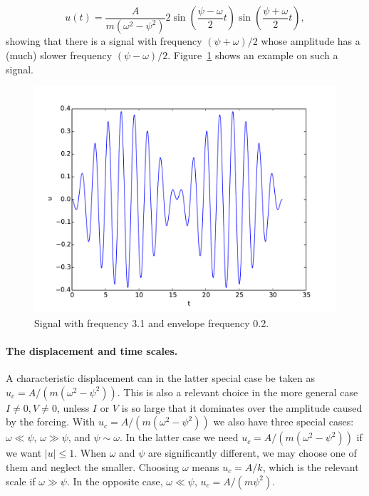 \documentclass[graybox,envcountchap,sectrefs,final]{svmonodo}
\begin{document}
\begin{equation}
u(t) = \frac{A}{m(\omega^2 - \psi^2)} 2
\sin\left(\frac{\psi - \omega}{2}t\right)
\sin\left(\frac{\psi + \omega}{2}t\right),
\label{sec:scale:vib:undamped:F:model:sinsin}
\end{equation}
showing that there is a signal with frequency $(\psi + \omega)/2$
whose amplitude has a (much) slower frequency
$(\psi - \omega)/2$. Figure~\ref{sec:scale:vib:fig:envelope} shows
an example on such a signal.



\begin{figure}[!ht]  %
  \centerline{\includegraphics[width=0.8\linewidth]{fig-scaling/envelope.pdf}}
  \caption{
  Signal with frequency 3.1 and envelope frequency 0.2. \label{sec:scale:vib:fig:envelope}
  }
\end{figure}



\paragraph{The displacement and time scales.}
A characteristic displacement can in the latter special case
be taken as $u_c= A/(m(\omega^2 - \psi^2))$. This is also a relevant choice
in the more general case $I\neq0, V\neq 0$, unless $I$ or $V$
is so large that it dominates over the amplitude
caused by the forcing. With $u_c= A/(m(\omega^2 - \psi^2))$ we also
have three special cases: $\omega \ll \psi$, $\omega \gg\psi$, and
$\psi \sim \omega$. In the latter case we need
$u_c= A/(m(\omega^2 - \psi^2))$ if we want $|u|\leq 1$. When
$\omega$ and $\psi$ are significantly different, we may choose one
of them and neglect the smaller. Choosing $\omega$ means $u_c=A/k$,
which is the relevant scale
if $\omega\gg\psi$. In the opposite case, $\omega\ll\psi$,
$u_c=A/(m\psi^2)$.
\end{document}
